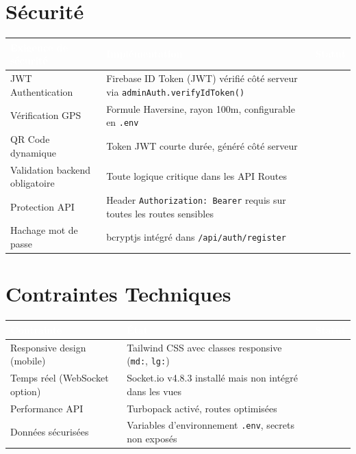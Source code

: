 \documentclass[12pt,a4paper]{article}
\newcommand{\cmark}{\textcolor{vert}{\ding{51}}}
\newcommand{\pmark}{\textcolor{orange}{\ding{115}}}
\begin{document}
\section{Sécurité}

\begin{longtable}{p{5cm} p{5.5cm} c}
\toprule
\rowcolor{headerblue}
\textcolor{white}{\textbf{Exigence de sécurité}} & \textcolor{white}{\textbf{Implémentation}} & \textcolor{white}{\textbf{Statut}} \\
\midrule
\endhead
JWT Authentication & Firebase ID Token (JWT) vérifié côté serveur via \texttt{adminAuth.verifyIdToken()} & \cmark \\
\midrule
Vérification GPS & Formule Haversine, rayon 100m, configurable en \texttt{.env} & \cmark \\
\midrule
QR Code dynamique & Token JWT courte durée, généré côté serveur & \cmark \\
\midrule
Validation backend obligatoire & Toute logique critique dans les API Routes & \cmark \\
\midrule
Protection API & Header \texttt{Authorization: Bearer} requis sur toutes les routes sensibles & \cmark \\
\midrule
Hachage mot de passe & bcryptjs intégré dans \texttt{/api/auth/register} & \cmark \\
\bottomrule
\end{longtable}

\section{Contraintes Techniques}

\begin{longtable}{p{5cm} p{5.5cm} c}
\toprule
\rowcolor{headerblue}
\textcolor{white}{\textbf{Contrainte}} & \textcolor{white}{\textbf{État}} & \textcolor{white}{\textbf{Statut}} \\
\midrule
\endhead
Responsive design (mobile) & Tailwind CSS avec classes responsive (\texttt{md:}, \texttt{lg:}) & \cmark \\
\midrule
Temps réel (WebSocket option) & Socket.io v4.8.3 installé mais non intégré dans les vues & \pmark \\
\midrule
Performance API & Turbopack activé, routes optimisées & \cmark \\
\midrule
Données sécurisées & Variables d'environnement \texttt{.env}, secrets non exposés & \cmark \\
\bottomrule
\end{longtable}
\end{document}
